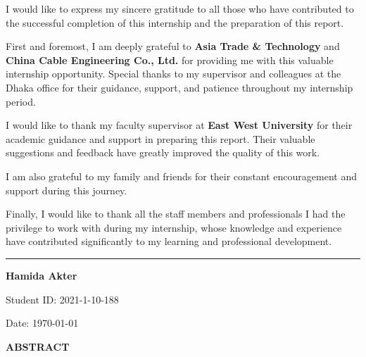 \vspace{2cm}
\begin{minipage}{0.9\textwidth}
    \large
    I would like to express my sincere gratitude to all those who have contributed to the successful completion of this internship and the preparation of this report.
    
    \vspace{1cm}
    First and foremost, I am deeply grateful to \textbf{Asia Trade \& Technology} and \textbf{China Cable Engineering Co., Ltd.} for providing me with this valuable internship opportunity. Special thanks to my supervisor and colleagues at the Dhaka office for their guidance, support, and patience throughout my internship period.
    
    \vspace{1cm}
    I would like to thank my faculty supervisor at \textbf{East West University} for their academic guidance and support in preparing this report. Their valuable suggestions and feedback have greatly improved the quality of this work.
    
    \vspace{1cm}
    I am also grateful to my family and friends for their constant encouragement and support during this journey.
    
    \vspace{1cm}
    Finally, I would like to thank all the staff members and professionals I had the privilege to work with during my internship, whose knowledge and experience have contributed significantly to my learning and professional development.
    
    \vspace{2cm}
    \begin{minipage}{0.4\textwidth}
        \centering
        \rule{6cm}{0.5pt}
        
        \vspace{0.3cm}
        \textbf{Hamida Akter}
        
        \vspace{0.2cm}
        Student ID: 2021-1-10-188
        
        \vspace{0.2cm}
        Date: \today
    \end{minipage}
\end{minipage}

\newpage
\thispagestyle{empty}
\centering

\vspace*{2cm}
{\Huge \textbf{ABSTRACT}}

